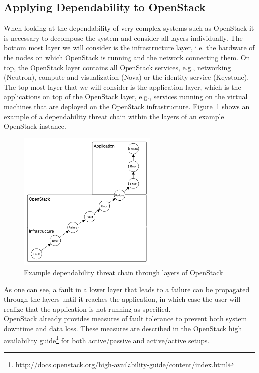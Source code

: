 \subsection{Applying Dependability to OpenStack}
When looking at the dependability of very complex systems such as OpenStack it is necessary to decompose the system and consider all layers individually. The bottom most layer we will consider is the infrastructure layer, i.e. the hardware of the nodes on which OpenStack is running and the network connecting them. On top, the OpenStack layer contains all OpenStack services, e.g., networking (Neutron), compute and visualization (Nova) or the identity service (Keystone). The top most layer that we will consider is the application layer, which is the applications on top of the OpenStack layer, e.g., services running on the virtual machines that are deployed on the OpenStack infrastructure. Figure~\ref{fig:depchain} shows an example of a dependability threat chain within the layers of an example OpenStack instance. 

\begin{figure}[h]
	\centering
		\includegraphics[width=0.60\textwidth]{images/depchain.PNG}
	\caption{Example dependability threat chain through layers of OpenStack}
	\label{fig:depchain}
\end{figure}

As one can see, a fault in a lower layer that leads to a failure can be propagated through the layers until it reaches the application, in which case the user will realize that the application is not running as specified.\\

OpenStack already provides measures of fault tolerance to prevent both system downtime and data loss. These measures are described in the OpenStack high availability guide\footnote{\url{http://docs.openstack.org/high-availability-guide/content/index.html}} for both active/passive and active/active setups. \\


